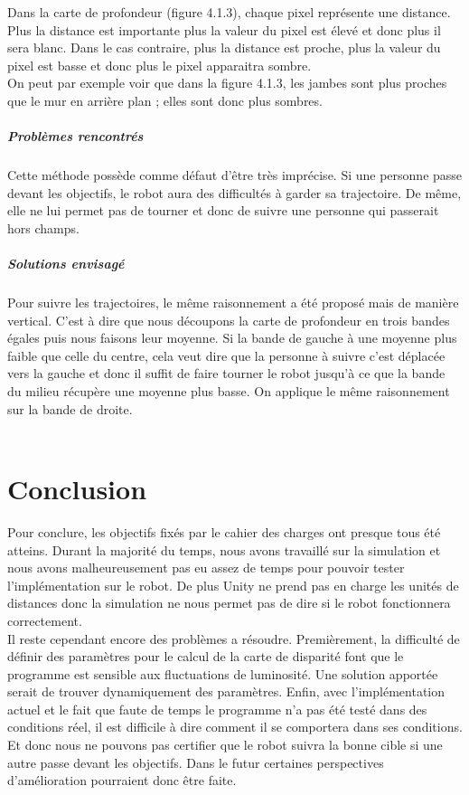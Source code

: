 \documentclass[12pt,a4paper]{report}
\begin{document}
Dans la carte de profondeur (figure 4.1.3), chaque pixel représente une distance. Plus la distance est importante plus la valeur du pixel est élevé et donc plus il sera blanc. Dans le cas contraire, plus la distance est proche, plus la valeur du pixel est basse et donc plus le pixel apparaitra sombre.\\
On peut par exemple voir que dans la figure 4.1.3, les jambes sont plus proches que le mur en arrière plan ; elles sont donc plus sombres.\\

\paragraph{Problèmes rencontrés}
Cette méthode possède comme défaut d'être très imprécise. Si une personne passe devant les objectifs, le robot aura des difficultés à garder sa trajectoire. De même, elle ne lui permet pas de tourner et donc de suivre une personne qui passerait hors champs.

\paragraph{Solutions envisagé}
Pour suivre les trajectoires, le même raisonnement a été proposé mais de manière vertical. C'est à dire que nous découpons la carte de profondeur en trois bandes égales puis nous faisons leur moyenne. Si la bande de gauche à une moyenne plus faible que celle du centre, cela veut dire que la personne à suivre c'est déplacée vers la gauche et donc il suffit de faire tourner le robot jusqu'à ce que la bande du milieu récupère une moyenne plus basse. On applique le même raisonnement sur la bande de droite.\\
\\

\chapter{Conclusion}

Pour conclure, les objectifs fixés par le cahier des charges ont presque tous été atteins. Durant la majorité du temps, nous avons travaillé sur la simulation et nous avons malheureusement pas eu assez de temps pour pouvoir tester l'implémentation sur le robot. De plus Unity ne prend pas en charge les unités de distances donc la simulation ne  nous permet pas de dire si le robot fonctionnera correctement.\\
Il reste cependant encore des problèmes a résoudre. Premièrement, la difficulté de définir des paramètres pour le calcul de la carte de disparité font que le programme est sensible aux fluctuations de luminosité. Une solution apportée serait de trouver dynamiquement des paramètres. Enfin, avec l'implémentation actuel et le fait que faute de temps le programme n'a pas été testé dans des conditions réel, il est difficile à dire comment il se comportera dans ses conditions. Et donc nous ne pouvons pas certifier que le robot suivra la bonne cible si une autre passe devant les objectifs. Dans le futur certaines perspectives d'amélioration pourraient donc être faite.
\end{document}
